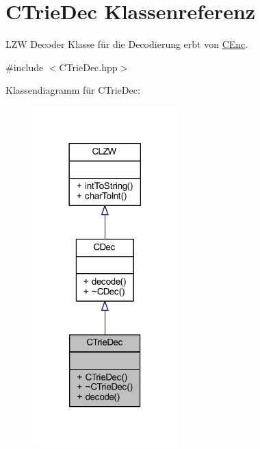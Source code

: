 \hypertarget{class_c_trie_dec}{}\section{C\+Trie\+Dec Klassenreferenz}
\label{class_c_trie_dec}


L\+ZW Decoder Klasse für die Decodierung erbt von \hyperlink{class_c_enc}{C\+Enc}.  




{\ttfamily \#include $<$C\+Trie\+Dec.\+hpp$>$}



Klassendiagramm für C\+Trie\+Dec\+:
\nopagebreak
\begin{figure}[H]
\begin{center}
\leavevmode
\includegraphics[width=158pt]{class_c_trie_dec__inherit__graph}
\end{center}
\end{figure}


